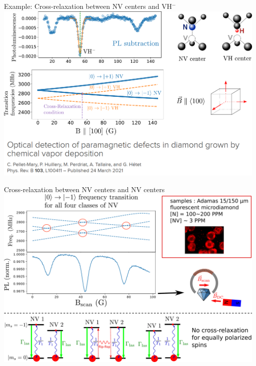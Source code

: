 \documentclass{beamer}
\begin{document}
\begin{frame}{Example: Cross-relaxation between NV centers and VH$^-$}
\centering
\includegraphics[width=\textwidth,height=0.9\textheight,keepaspectratio]{Slide_CR_VH}
\end{frame}

\begin{frame}{Cross-relaxation between NV centers and NV centers}
\centering
\includegraphics[width=\textwidth,height=0.9\textheight,keepaspectratio]{Slide_CR_adamas}
\end{frame}
\end{document}
